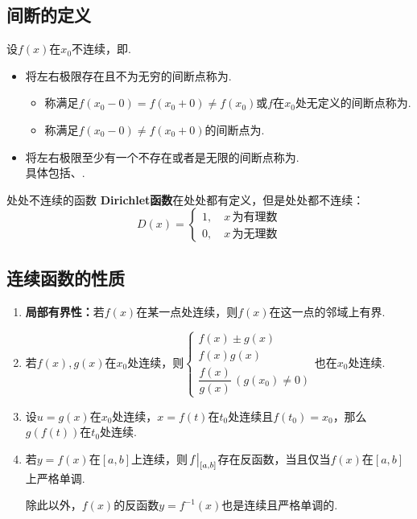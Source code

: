 \subsection{间断的定义}
\begin{definition}
    设$f(x)$在$x_0$不连续，即.

    \begin{itemize}
        \item 将左右极限存在且不为无穷的间断点称为.
        \begin{itemize}
            \item 称满足$f(x_0-0)=f(x_0+0)\neq f(x_0)$或$f$在$x_0$处无定义的间断点称为.
            \item 称满足$f(x_0-0)\neq f(x_0+0)$的间断点为.
        \end{itemize}
        \item 将左右极限至少有一个不存在或者是无限的间断点称为.\\
        具体包括、.
    \end{itemize}
\end{definition}

\begin{extension}{处处不连续的函数}
    \textbf{Dirichlet函数}在处处都有定义，但是处处都不连续：
    \[D(x)=\begin{cases}
        1,\quad x \,\text{为有理数}\\
        0,\quad x \,\text{为无理数}
    \end{cases}\]
\end{extension}


\subsection{连续函数的性质}
\begin{enumerate}[property]
    \item \textbf{局部有界性：}若$f(x)$在某一点处连续，则$f(x)$在这一点的邻域上有界.
    \item 若$f(x),g(x)$在$x_0$处连续，则$\begin{cases}
        f(x)\pm g(x)\\
        f(x)g(x)\\
        \dfrac{f(x)}{g(x)}\,(g(x_0)\neq 0)
    \end{cases}$也在$x_0$处连续.
    \item 设$u=g(x)$在$x_0$处连续，$x=f(t)$在$t_0$处连续且$f(t_0)=x_0$，那么$g(f(t))$在$t_0$处连续.
    \item 若$y=f(x)$在$[a,b]$上连续，则$\eval{f}_{[a,b]}$存在反函数，当且仅当$f(x)$在$[a,b]$上严格单调.
    
    除此以外，$f(x)$的反函数$y=f^{-1}(x)$也是连续且严格单调的.
\end{enumerate}


